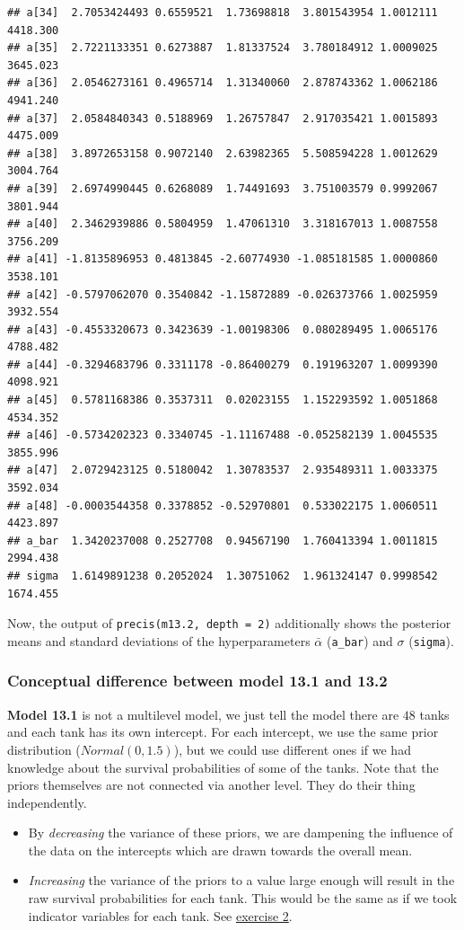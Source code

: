 \documentclass[
]{book}
\begin{document}
\begin{verbatim}
## a[34]  2.7053424493 0.6559521  1.73698818  3.801543954 1.0012111 4418.300
## a[35]  2.7221133351 0.6273887  1.81337524  3.780184912 1.0009025 3645.023
## a[36]  2.0546273161 0.4965714  1.31340060  2.878743362 1.0062186 4941.240
## a[37]  2.0584840343 0.5188969  1.26757847  2.917035421 1.0015893 4475.009
## a[38]  3.8972653158 0.9072140  2.63982365  5.508594228 1.0012629 3004.764
## a[39]  2.6974990445 0.6268089  1.74491693  3.751003579 0.9992067 3801.944
## a[40]  2.3462939886 0.5804959  1.47061310  3.318167013 1.0087558 3756.209
## a[41] -1.8135896953 0.4813845 -2.60774930 -1.085181585 1.0000860 3538.101
## a[42] -0.5797062070 0.3540842 -1.15872889 -0.026373766 1.0025959 3932.554
## a[43] -0.4553320673 0.3423639 -1.00198306  0.080289495 1.0065176 4788.482
## a[44] -0.3294683796 0.3311178 -0.86400279  0.191963207 1.0099390 4098.921
## a[45]  0.5781168386 0.3537311  0.02023155  1.152293592 1.0051868 4534.352
## a[46] -0.5734202323 0.3340745 -1.11167488 -0.052582139 1.0045535 3855.996
## a[47]  2.0729423125 0.5180042  1.30783537  2.935489311 1.0033375 3592.034
## a[48] -0.0003544358 0.3378852 -0.52970801  0.533022175 1.0060511 4423.897
## a_bar  1.3420237008 0.2527708  0.94567190  1.760413394 1.0011815 2994.438
## sigma  1.6149891238 0.2052024  1.30751062  1.961324147 0.9998542 1674.455
\end{verbatim}

Now, the output of \texttt{precis(m13.2,\ depth\ =\ 2)} additionally shows the posterior means
and standard deviations of the hyperparameters \(\bar{\alpha}\) (\texttt{a\_bar})
and \(\sigma\) (\texttt{sigma}).

\subsubsection{Conceptual difference between model 13.1 and 13.2}\label{conceptual-difference-between-model-13.1-and-13.2}

\textbf{Model 13.1} is not a multilevel model, we just tell the model there are
\(48\) tanks and each tank has its own intercept. For each intercept, we use
the same prior distribution (\(Normal (0, 1.5)\)), but we could use different ones if
we had knowledge about the survival probabilities of some of the tanks.
Note that the priors themselves are not connected via another level.
They do their thing independently.

\begin{itemize}
\item
  By \emph{decreasing} the variance of these priors,
  we are dampening the influence of the data on the intercepts
  which are drawn towards the overall mean.
\item
  \emph{Increasing} the variance of the priors
  to a value large enough will result in the raw survival probabilities for each tank.
  This would be the same as if we took indicator variables for each tank.
  See \hyperref[exercise2_LMM]{exercise 2}.
\end{itemize}
\end{document}
